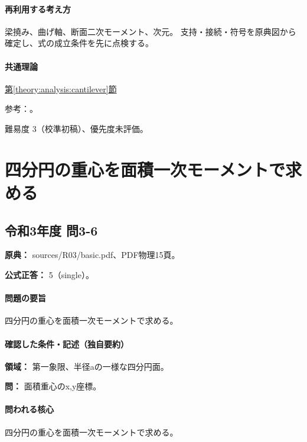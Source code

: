 \paragraph{再利用する考え方} 梁撓み、曲げ軸、断面二次モーメント、次元。 支持・接続・符号を原典図から確定し、式の成立条件を先に点検する。

\paragraph{共通理論} \hyperref[theory:analysis:cantilever]{第\ref*{theory:analysis:cantilever}節}

\par 参考：\cite{struct_mit_beam}。

\par 難易度 3（校準初稿）、優先度未評価。

\section{四分円の重心を面積一次モーメントで求める}

\subsection{令和3年度 問3-6}
\label{q:r03-reg-basic-3-6}

\noindent\textbf{原典：} sources/R03/basic.pdf、PDF物理15頁。

\textbf{公式正答：} 5（single）。

\paragraph{問題の要旨} 四分円の重心を面積一次モーメントで求める。

\paragraph{確認した条件・記述（独自要約）}\mbox{}\par

\noindent\textbf{領域：} 第一象限、半径aの一様な四分円面。\par

\noindent\textbf{問：} 面積重心のx,y座標。\par

\paragraph{問われる核心} 四分円の重心を面積一次モーメントで求める。

